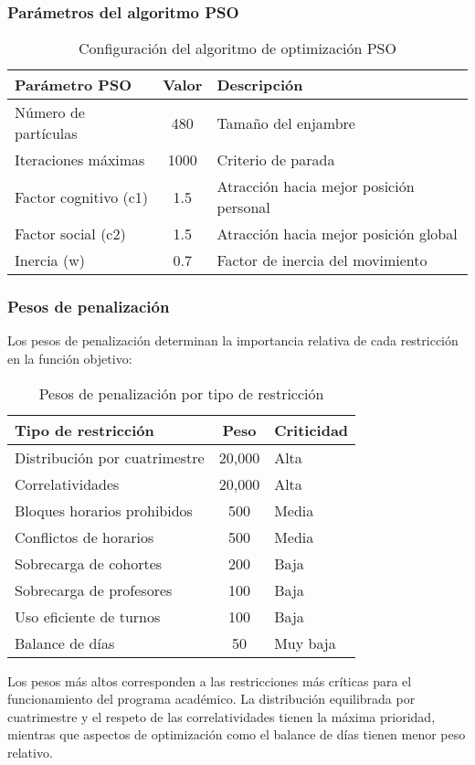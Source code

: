 \subsubsection{Parámetros del algoritmo PSO}
\begin{table}[ht]
\centering
\begin{tabular}{|l|c|l|}
\hline
\textbf{Parámetro PSO} & \textbf{Valor} & \textbf{Descripción} \\
\hline
Número de partículas & 480 & Tamaño del enjambre \\
Iteraciones máximas & 1000 & Criterio de parada \\
Factor cognitivo (c1) & 1.5 & Atracción hacia mejor posición personal \\
Factor social (c2) & 1.5 & Atracción hacia mejor posición global \\
Inercia (w) & 0.7 & Factor de inercia del movimiento \\
\hline
\end{tabular}
\caption{Configuración del algoritmo de optimización PSO}
\end{table}

\subsubsection{Pesos de penalización}
Los pesos de penalización determinan la importancia relativa de cada restricción en la función objetivo:

\begin{table}[ht]
\centering
\begin{tabular}{|l|c|l|}
\hline
\textbf{Tipo de restricción} & \textbf{Peso} & \textbf{Criticidad} \\
\hline
Distribución por cuatrimestre & 20,000 & Alta \\
Correlatividades & 20,000 & Alta \\
Bloques horarios prohibidos & 500 & Media \\
Conflictos de horarios & 500 & Media \\
Sobrecarga de cohortes & 200 & Baja \\
Sobrecarga de profesores & 100 & Baja \\
Uso eficiente de turnos & 100 & Baja \\
Balance de días & 50 & Muy baja \\
\hline
\end{tabular}
\caption{Pesos de penalización por tipo de restricción}
\end{table}

Los pesos más altos corresponden a las restricciones más críticas para el funcionamiento del programa académico. La distribución equilibrada por cuatrimestre y el respeto de las correlatividades tienen la máxima prioridad, mientras que aspectos de optimización como el balance de días tienen menor peso relativo.